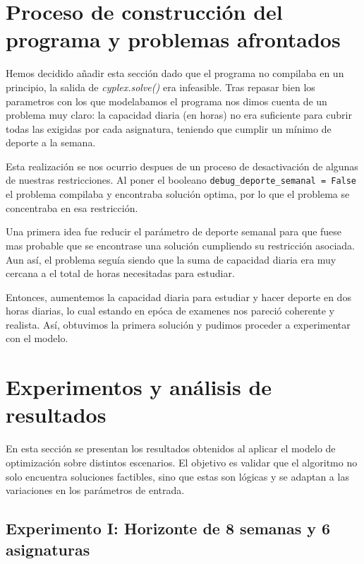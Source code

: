 \documentclass{article}
\begin{document}
\section{Proceso de construcción del programa y problemas afrontados}

Hemos decidido añadir esta sección dado que el programa no compilaba en un principio, la salida de \textit{cyplex.solve()} era infeasible. Tras repasar bien los parametros con los que modelabamos el programa nos dimos cuenta de un problema muy claro: la capacidad diaria (en horas) no era suficiente para cubrir todas las exigidas por cada asignatura, teniendo que cumplir un mínimo de deporte a la semana.

\vspace{0.5cm}

Esta realización se nos ocurrio despues de un proceso de desactivación de algunas de nuestras restricciones. Al poner el booleano \texttt{debug\_deporte\_semanal = False} el problema compilaba y encontraba solución optima, por lo que el problema se concentraba en esa restricción.

\vspace{0.5cm}

Una primera idea fue reducir el parámetro de deporte semanal para que fuese mas probable que se encontrase una solución cumpliendo su restricción asociada. Aun así, el problema seguía siendo que la suma de capacidad diaria era muy cercana a el total de horas necesitadas para estudiar. 

\vspace{0.5cm}

Entonces, aumentemos la capacidad diaria para estudiar y hacer deporte en dos horas diarias, lo cual estando en epóca de examenes nos pareció coherente y realista. Así, obtuvimos la primera solución y pudimos proceder a experimentar con el modelo. 

\section{Experimentos y análisis de resultados}

En esta sección se presentan los resultados obtenidos al aplicar el modelo de optimización sobre distintos escenarios. El objetivo es validar que el algoritmo no solo encuentra soluciones factibles, sino que estas son lógicas y se adaptan a las variaciones en los parámetros de entrada.


\subsection{Experimento I: Horizonte de 8 semanas y 6 asignaturas}
\end{document}
